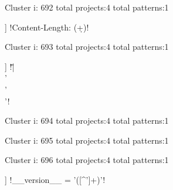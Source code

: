 Cluster i: 692
total projects:4
total patterns:1
\begin{multicols}{1}
\begin{description}[noitemsep,topsep=0pt]
\item [[4] ] \cverb!Content-Length: (\d+)!
\end{description}
\end{multicols}







Cluster i: 693
total projects:4
total patterns:1
\begin{multicols}{1}
\begin{description}[noitemsep,topsep=0pt]
\item [[4] ] \cverb!\"\"\"|\\'\\'\\'!
\end{description}
\end{multicols}







Cluster i: 694
total projects:4
total patterns:1
\begin{multicols}{1}
\end{multicols}







Cluster i: 695
total projects:4
total patterns:1
\begin{multicols}{1}
\end{multicols}







Cluster i: 696
total projects:4
total patterns:1
\begin{multicols}{1}
\begin{description}[noitemsep,topsep=0pt]
\item [[4] ] \cverb!__version__ = '([^']+)'!
\end{description}
\end{multicols}







